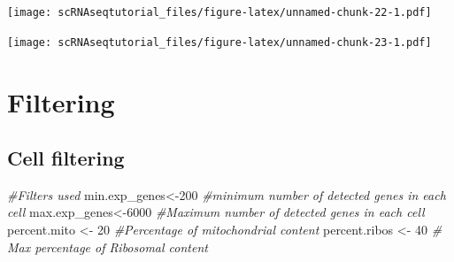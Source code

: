 \documentclass[
  openany]{book}
\newenvironment{Shaded}{\begin{snugshade}}{\end{snugshade}}
\newcommand{\AttributeTok}[1]{\textcolor[rgb]{0.77,0.63,0.00}{#1}}
\newcommand{\CommentTok}[1]{\textcolor[rgb]{0.56,0.35,0.01}{\textit{#1}}}
\newcommand{\ControlFlowTok}[1]{\textcolor[rgb]{0.13,0.29,0.53}{\textbf{#1}}}
\newcommand{\DecValTok}[1]{\textcolor[rgb]{0.00,0.00,0.81}{#1}}
\newcommand{\FloatTok}[1]{\textcolor[rgb]{0.00,0.00,0.81}{#1}}
\newcommand{\FunctionTok}[1]{\textcolor[rgb]{0.00,0.00,0.00}{#1}}
\newcommand{\NormalTok}[1]{#1}
\newcommand{\OtherTok}[1]{\textcolor[rgb]{0.56,0.35,0.01}{#1}}
\newcommand{\SpecialCharTok}[1]{\textcolor[rgb]{0.00,0.00,0.00}{#1}}
\newcommand{\StringTok}[1]{\textcolor[rgb]{0.31,0.60,0.02}{#1}}
\begin{document}
\texttt{[image: scRNAseqtutorial\_files/figure-latex/unnamed-chunk-22-1.pdf]}

\begin{Shaded}
\end{Shaded}

\texttt{[image: scRNAseqtutorial\_files/figure-latex/unnamed-chunk-23-1.pdf]}

\hypertarget{filtering}{%
\section{Filtering}\label{filtering}}

\hypertarget{cell-filtering}{%
\subsection{Cell filtering}\label{cell-filtering}}

\begin{Shaded}
\begin{Highlighting}[]
\CommentTok{\#Filters used }
\NormalTok{min.exp\_genes}\OtherTok{\textless{}{-}}\DecValTok{200} \CommentTok{\#minimum number of detected genes in each cell}
\NormalTok{max.exp\_genes}\OtherTok{\textless{}{-}}\DecValTok{6000} \CommentTok{\#Maximum number of detected genes in each cell}
\NormalTok{percent.mito }\OtherTok{\textless{}{-}} \DecValTok{20} \CommentTok{\#Percentage of mitochondrial content}
\NormalTok{percent.ribos }\OtherTok{\textless{}{-}} \DecValTok{40} \CommentTok{\# Max percentage of Ribosomal content}
\end{Highlighting}
\end{Shaded}
\end{document}
